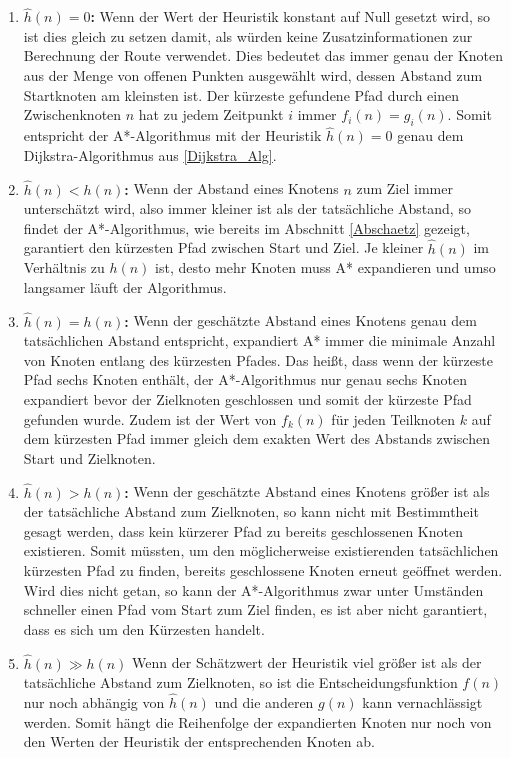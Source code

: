 		\begin{enumerate}
			\item \textbf{$\hat{h}(n)=0$:} Wenn der Wert der Heuristik konstant auf Null gesetzt wird, so ist dies gleich zu setzen damit, als würden keine Zusatzinformationen zur Berechnung der Route verwendet. Dies bedeutet das immer genau der Knoten aus der Menge von offenen Punkten ausgewählt wird, dessen Abstand zum Startknoten am kleinsten ist. Der kürzeste gefundene Pfad durch einen Zwischenknoten $n$ hat zu jedem Zeitpunkt $i$ immer $f_i(n)=g_i(n)$. Somit entspricht der A*-Algorithmus mit der Heuristik $\hat{h}(n)=0$ genau dem Dijkstra-Algorithmus aus \ref{Dijkstra_Alg}.
			
			\item \textbf{$\hat{h}(n)<h(n)$:} Wenn der Abstand eines Knotens $n$ zum Ziel immer unterschätzt wird, also immer kleiner ist als der tatsächliche Abstand, so findet der A*-Algorithmus, wie bereits im Abschnitt \ref{Abschaetz} gezeigt, garantiert den kürzesten Pfad zwischen Start und Ziel. Je kleiner $\hat{h}(n)$ im Verhältnis zu $h(n)$ ist, desto mehr Knoten muss A* expandieren und umso langsamer läuft der Algorithmus.
			
			\item \textbf{$\hat{h}(n)=h(n)$:} Wenn der geschätzte Abstand eines Knotens genau dem tatsächlichen Abstand entspricht, expandiert A* immer die minimale Anzahl von Knoten entlang des kürzesten Pfades. Das heißt, dass wenn der kürzeste Pfad sechs Knoten enthält, der A*-Algorithmus nur genau sechs Knoten expandiert bevor der Zielknoten geschlossen und somit der kürzeste Pfad gefunden wurde. Zudem ist der Wert von $f_k(n)$ für jeden Teilknoten $k$ auf dem kürzesten Pfad immer gleich dem exakten Wert des Abstands zwischen Start und Zielknoten.
			
			\item \textbf{$\hat{h}(n)>h(n)$:} Wenn der geschätzte Abstand eines Knotens größer ist als der tatsächliche Abstand zum Zielknoten, so kann nicht mit Bestimmtheit gesagt werden, dass kein kürzerer Pfad zu bereits geschlossenen Knoten existieren.  Somit müssten, um den möglicherweise existierenden tatsächlichen kürzesten Pfad zu finden, bereits geschlossene Knoten erneut geöffnet werden. Wird dies nicht getan, so kann der A*-Algorithmus zwar unter Umständen schneller einen Pfad vom Start zum Ziel finden, es ist aber nicht garantiert, dass es sich um den Kürzesten handelt.
			
			\item \textbf{$\hat{h}(n)\gg h(n)$} Wenn der Schätzwert der Heuristik viel größer ist als der tatsächliche Abstand zum Zielknoten, so ist die Entscheidungsfunktion $f(n)$ nur noch abhängig von $\hat{h}(n)$ und die anderen $g(n)$ kann vernachlässigt werden. Somit hängt die Reihenfolge der expandierten Knoten nur noch von den Werten der Heuristik der entsprechenden Knoten ab.
		\end{enumerate}
		 
